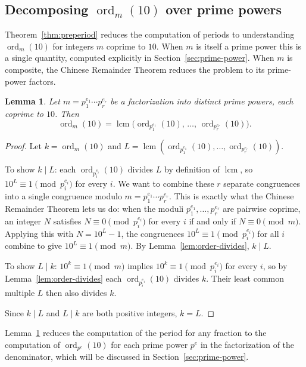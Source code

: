 \documentclass[12pt]{amsart}
\newtheorem{lemma}[theorem]{Lemma}
\theoremstyle{definition}
\theoremstyle{remark}
\newcommand{\ord}{\operatorname{ord}}
\newcommand{\lcm}{\operatorname{lcm}}
\begin{document}
\subsection{Decomposing $\ord_m(10)$ over prime powers}

Theorem~\ref{thm:preperiod} reduces the computation of periods to 
understanding $\ord_m(10)$ for integers $m$ coprime to $10$. When 
$m$ is itself a prime power this is a single quantity, computed 
explicitly in Section~\ref{sec:prime-power}. When $m$ is composite, 
the Chinese Remainder Theorem reduces the problem to its prime-power 
factors.

\begin{lemma}\label{lem:ord-lcm}
Let $m = p_1^{e_1} \cdots p_r^{e_r}$ be a factorization into distinct 
prime powers, each coprime to $10$. Then
\[
  \ord_m(10) = \lcm\!\bigl(\ord_{p_1^{e_1}}(10),\, \ldots,\, 
  \ord_{p_r^{e_r}}(10)\bigr).
\]
\end{lemma}

\begin{proof}
Let $k = \ord_m(10)$ and $L = \lcm(\ord_{p_1^{e_1}}(10), \ldots, 
\ord_{p_r^{e_r}}(10))$.

To show $k \mid L$: each $\ord_{p_i^{e_i}}(10)$ divides $L$ by 
definition of $\lcm$, so $10^L \equiv 1 \pmod{p_i^{e_i}}$ for every 
$i$. We want to combine these $r$ separate congruences into a single 
congruence modulo $m = p_1^{e_1} \cdots p_r^{e_r}$. This is exactly 
what the Chinese Remainder Theorem lets us do: when the moduli 
$p_1^{e_1}, \ldots, p_r^{e_r}$ are pairwise coprime, an integer $N$ 
satisfies $N \equiv 0 \pmod{p_i^{e_i}}$ for every $i$ if and only if 
$N \equiv 0 \pmod{m}$. Applying this with $N = 10^L - 1$, the 
congruences $10^L \equiv 1 \pmod{p_i^{e_i}}$ for all $i$ combine to 
give $10^L \equiv 1 \pmod{m}$. By Lemma~\ref{lem:order-divides}, 
$k \mid L$.

To show $L \mid k$: $10^k \equiv 1 \pmod{m}$ implies $10^k \equiv 1 
\pmod{p_i^{e_i}}$ for every $i$, so by Lemma~\ref{lem:order-divides} 
each $\ord_{p_i^{e_i}}(10)$ divides $k$. Their least common multiple 
$L$ then also divides $k$.

Since $k \mid L$ and $L \mid k$ are both positive integers, $k = L$.
\end{proof}

Lemma~\ref{lem:ord-lcm} reduces the computation of the period for any 
fraction to the computation of $\ord_{p^e}(10)$ for each prime power 
$p^e$ in the factorization of the denominator, which will be discussed in Section~\ref{sec:prime-power}.
\end{document}
